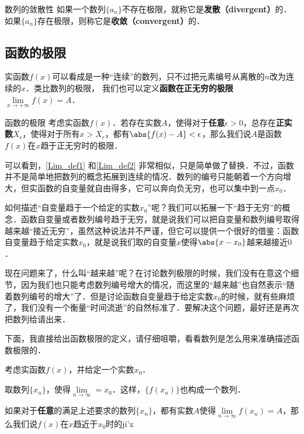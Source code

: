 \begin{definition}{数列的敛散性}
如果一个数列$\{a_n\}$不存在极限，就称它是\textbf{发散（divergent）}的．如果$\{a_n\}$存在极限，则称它是\textbf{收敛（convergent）}的．
\end{definition}

\subsection{函数的极限}
实函数$f(x)$可以看成是一种“连续”的数列，只不过把元素编号从离散的$n$改为连续的$x$．类比数列的极限， 我们也可以定义\textbf{函数在正无穷的极限} $\lim\limits_{x\to +\infty} f(x) = A$．

\begin{definition}{函数的极限}\label{Lim_def1}
考虑实函数$f(x)$．若存在实数$A$，使得对于\textbf{任意}$\epsilon>0$，总存在\textbf{正实数}$X_\epsilon$，使得对于所有$x>X_\epsilon$，都有$\abs{f(x)-A}<\epsilon$，那么我们说$A$是函数$f(x)$在$x$趋于正无穷时的极限．
\end{definition}

可以看到，\autoref{Lim_def1} 和\autoref{Lim_def2} 非常相似，只是简单做了替换．不过，函数并不是简单地把数列的概念拓展到连续的情况．数列的编号只能朝着一个方向增大，但实函数的自变量就自由得多，它可以奔向负无穷，也可以集中到一点$x_0$．

如何描述“自变量趋于一个给定的实数$x_0$”呢？我们可以拓展一下“趋于无穷”的概念．函数自变量或者数列编号趋于无穷，就是说我们可以把自变量和数列编号取得越来越“接近无穷”，虽然这种说法并不严谨，但它可以提供一个很好的借鉴：函数自变量趋于给定实数$x_0$，就是说我们取的自变量$x$使得$\abs{x-x_0}$越来越接近$0$．

现在问题来了，什么叫“越来越”呢？在讨论数列极限的时候，我们没有在意这个细节，因为我们也只能考虑数列编号增大的情况，而这里的“越来越”也自然表示“随着数列编号的增大”了．但是讨论函数自变量趋于给定实数$x_0$的时候，就有些麻烦了，我们没有一个衡量“时间流逝”的自然标准了．要解决这个问题，最好还是再次把数列给请出来．

下面，我直接给出函数极限的定义，请仔细咀嚼，看看数列是怎么用来准确描述函数极限的．

\begin{definition}{}
考虑实函数$f(x)$，并给定一个实数$x_0$．

取数列$\{x_n\}$，使得$\lim\limits_{n\to\infty}=x_0$．这样，$\{f(x_n)\}$也构成一个数列．

如果对于\textbf{任意}的满足上述要求的数列$\{x_n\}$，都有实数$A$使得$\lim\limits_{n\to\infty}f(x_n)=A$，那么我们说$f(x)$在$x$趋近于$x_0$时的ji'x
\end{definition}

